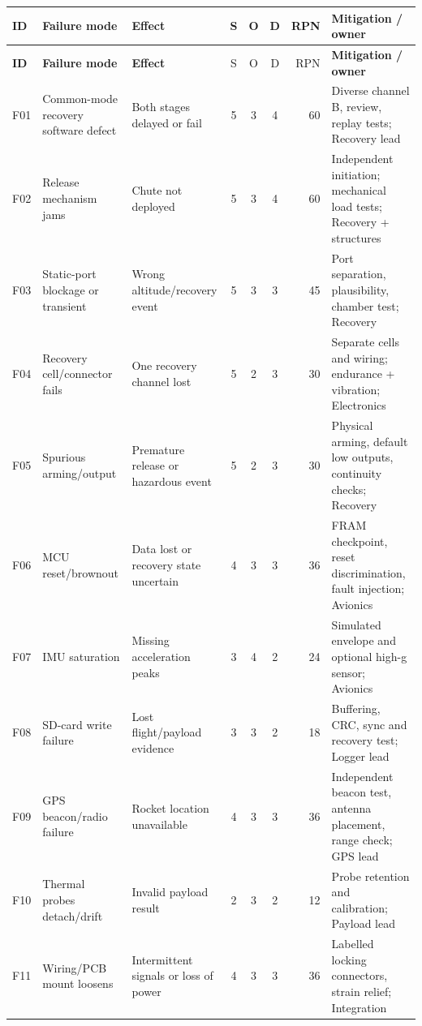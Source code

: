 \footnotesize
{}
\begin{longtable}{@{}L{9mm}L{30mm}L{32mm}c c c r L{37mm}@{}}
\toprule{}\textbf{ID}&\textbf{Failure mode}&\textbf{Effect}&\textbf{S}&\textbf{O}&\textbf{D}&\textbf{RPN}&\textbf{Mitigation / owner}\\\midrule\endfirsthead
\toprule{}\textbf{ID}&\textbf{Failure mode}&\textbf{Effect}&S&O&D&RPN&\textbf{Mitigation / owner}\\\midrule\endhead
\bottomrule\endlastfoot
F01 & Common-mode recovery software defect & Both stages delayed or fail & 5 & 3 & 4 & 60 & Diverse channel B, review, replay tests; Recovery lead\\
F02 & Release mechanism jams & Chute not deployed & 5 & 3 & 4 & 60 & Independent initiation; mechanical load tests; Recovery + structures\\
F03 & Static-port blockage or transient & Wrong altitude/recovery event & 5 & 3 & 3 & 45 & Port separation, plausibility, chamber test; Recovery\\
F04 & Recovery cell/connector fails & One recovery channel lost & 5 & 2 & 3 & 30 & Separate cells and wiring; endurance + vibration; Electronics\\
F05 & Spurious arming/output & Premature release or hazardous event & 5 & 2 & 3 & 30 & Physical arming, default low outputs, continuity checks; Recovery\\
F06 & MCU reset/brownout & Data lost or recovery state uncertain & 4 & 3 & 3 & 36 & FRAM checkpoint, reset discrimination, fault injection; Avionics\\
F07 & IMU saturation & Missing acceleration peaks & 3 & 4 & 2 & 24 & Simulated envelope and optional high-g sensor; Avionics\\
F08 & SD-card write failure & Lost flight/payload evidence & 3 & 3 & 2 & 18 & Buffering, CRC, sync and recovery test; Logger lead\\
F09 & GPS beacon/radio failure & Rocket location unavailable & 4 & 3 & 3 & 36 & Independent beacon test, antenna placement, range check; GPS lead\\
F10 & Thermal probes detach/drift & Invalid payload result & 2 & 3 & 2 & 12 & Probe retention and calibration; Payload lead\\
F11 & Wiring/PCB mount loosens & Intermittent signals or loss of power & 4 & 3 & 3 & 36 & Labelled locking connectors, strain relief; Integration\\
\end{longtable}
\normalsize

